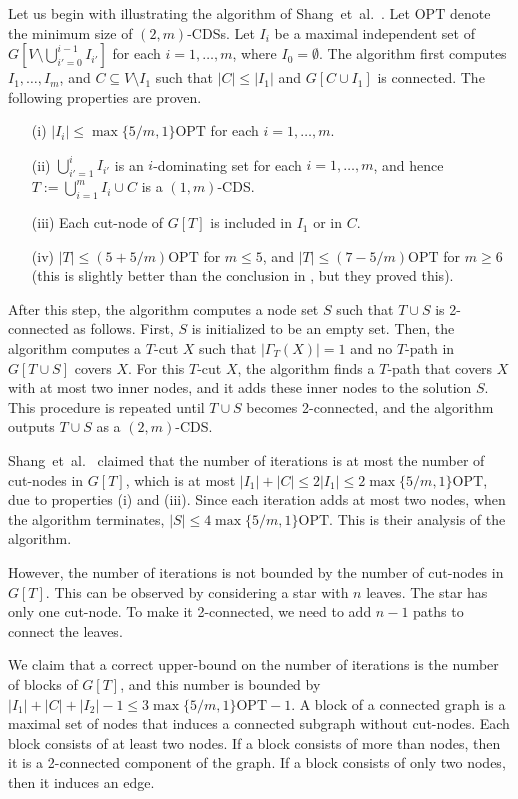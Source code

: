 \documentclass[11pt]{article}
\newcommand{\opt}{\mathrm{OPT}}
\begin{document}
Let us begin with illustrating the algorithm of Shang~et~al.~\cite{Shang:2007jg}.
Let $\opt$ denote the minimum size of $(2,m)$-CDSs.
Let $I_{i}$ be a maximal independent set of $G[V \setminus
\bigcup_{i'=0}^{i-1} I_{i'}]$ for each $i =1,\ldots,m$, where $I_0=\emptyset$.
The algorithm first computes $I_1,\ldots,I_m$,
and $C \subseteq V \setminus I_1$ such that $|C|\leq |I_1|$ and
$G[C \cup I_1]$ is connected.
The following properties are proven.
 \begin{itemize}
  \item[(i)] $|I_i| \leq \max\{5/m,1\}\opt$ for each $i=1,\ldots,m$.
  \item[(ii)] $\bigcup_{i'=1}^{i}I_{i'}$ is an $i$-dominating set for
	      each $i=1,\ldots,m$,
	      and hence $T:= \bigcup_{i=1}^m I_i \cup C$ is a $(1,m)$-CDS.
  \item[(iii)] Each cut-node of $G[T]$ is included in $I_1$ or in $C$.
  \item[(iv)] $|T| \leq (5+5/m)\opt$ for $m\leq 5$,
	      and $|T| \leq (7-5/m)\opt$ for $m \geq 6$
	      (this is slightly better than the conclusion in
	      \cite{Shang:2007jg}, but they proved this).
 \end{itemize}

 After this step,
the algorithm computes a
node set $S$ such that $T\cup S$ is 2-connected as follows.
First, $S$ is initialized to be an empty set.
Then, the algorithm computes
a $T$-cut $X$ such that $|\Gamma_{T}(X)|=1$
and no $T$-path in $G[T \cup S]$
covers $X$.
For this $T$-cut $X$,
the algorithm finds a $T$-path that covers $X$ with at most two inner nodes,
and it adds these inner nodes to the solution $S$.
This procedure is repeated until $T \cup S$ becomes 2-connected,
and the algorithm outputs $T\cup S$
as a $(2,m)$-CDS.

Shang~et~al.\ \cite{Shang:2007jg} claimed that the number of iterations is at most
the number of cut-nodes in $G[T]$, which is 
at most $|I_1| + |C| \leq 2|I_1| \leq 2\max\{5/m,1\}\opt$, due to
properties (i) and (iii).
Since each iteration adds at most two nodes, when the algorithm terminates, 
 $|S| \leq 4\max\{5/m,1\}\opt$.
 This is their analysis of the algorithm.

 However, the number of iterations is not bounded by the number of cut-nodes in $G[T]$.
 This can be observed by considering a star with $n$ leaves.
 The star has only one cut-node. To make it 2-connected,
 we need to add $n-1$ paths to connect the leaves.

 We claim that a correct upper-bound on the number of iterations
 is the number of blocks of $G[T]$,
 and this number is bounded by $|I_1|+|C|+|I_2| -1 \leq 3\max\{5/m,1\}\opt-1$.
 A block of a connected graph is a maximal set of nodes that induces a connected subgraph without cut-nodes.
 Each block consists of at least two nodes.
 If a block consists of more than nodes, then it is a 2-connected component of the graph.
 If a block consists of only two nodes, then it induces an edge.
\end{document}

